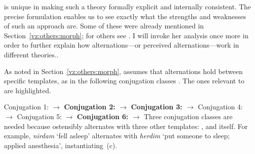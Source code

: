 \begin{exe}
\begin{xlist}
\begin{xlist}
\begin{exe}
\begin{exe}
\begin{xlist}
\begin{exe}
\begin{xlist}
\begin{exe}
\begin{xlist}
\begin{xlist}
\begin{exe}
\begin{xlist}
\begin{exe}
\begin{xlist}
\begin{exe}
\begin{exe}
\begin{exe}
\begin{xlist}
\begin{exe}
\begin{exe}
\begin{xlist}
\begin{xlist}
\begin{exe}
\begin{xlist}
\begin{exe}
\begin{exe}
\begin{exe}
\begin{xlist}
\begin{exe}
\begin{exe}
\begin{xlist}
\begin{exe}
\begin{xlist}
\begin{exe}
\begin{xlist}
\begin{exe}
\begin{xlist}
\begin{exe}
\begin{exe}
\begin{xlist}
\begin{exe}
\begin{exe}
\begin{xlist}
\begin{xlist}
\begin{exe}
\begin{xlist}
\begin{xlist}
\begin{exe}
\begin{xlist}
\begin{exe}
\begin{xlist}
\begin{exe}
\begin{xlist}
\begin{exe}
\begin{xlist}
\begin{exe}
\begin{exe}
\begin{exe}
\begin{exe}
\begin{xlist}
\begin{exe}
\begin{exe}
\begin{xlist}
\begin{xlist}
\begin{exe}
\cite{arad05} is unique in making such a theory formally explicit and internally consistent. The precise formulation enables us to see exactly what the strengths and weaknesses of such an approach are. Some of these were already mentioned in Section~\ref{vz:others:morph}; for others see \cite{kastnertucker19cup}. I will invoke her analysis once more in order to further explain how alternations---or perceived alternations---work in different theories..

As noted in Section~\ref{vz:others:morph}, \cite{arad05} assumes that alternations hold between specific templates, as in the following conjugation classes \cite[226]{arad05}. The ones relevant to {\thif} are highlighted.
 \begin{exe}
 \ex  
 \begin{xlist} 
 	\ex  Conjugation 1: {\tnif} $\rightarrow$ {\tkal} 
 	\ex  \textbf{Conjugation 2: {\tkal} $\rightarrow$ {\thif}} 
 	\ex  \textbf{Conjugation 3: {\tnif} $\rightarrow$ {\thif}} 
 	\ex  Conjugation 4: {\thit} $\rightarrow$ {\tpie} 
 	\ex  Conjugation 5: {\thit} $\rightarrow$ {\tpie} 
 	\ex  \textbf{Conjugation 6: {\thif} $\rightarrow$ {\thif}} 
 \z
\z 
Three conjugation classes are needed because {\thif} ostensibly alternates with three other templates: {\tkal}, {\tnif} and {\thif} itself. For example, \emph{nirdam} `fell asleep' alternates with \emph{herdim} `put someone to sleep; applied anesthesia', instantiating~(\lastx c).


\end{xlist}
\end{exe}
\end{exe}
\end{xlist}
\end{xlist}
\end{exe}
\end{exe}
\end{xlist}
\end{exe}
\end{exe}
\end{exe}
\end{exe}
\end{xlist}
\end{exe}
\end{xlist}
\end{exe}
\end{xlist}
\end{exe}
\end{xlist}
\end{exe}
\end{xlist}
\end{xlist}
\end{exe}
\end{xlist}
\end{xlist}
\end{exe}
\end{exe}
\end{xlist}
\end{exe}
\end{exe}
\end{xlist}
\end{exe}
\end{xlist}
\end{exe}
\end{xlist}
\end{exe}
\end{xlist}
\end{exe}
\end{exe}
\end{xlist}
\end{exe}
\end{exe}
\end{exe}
\end{xlist}
\end{exe}
\end{xlist}
\end{xlist}
\end{exe}
\end{exe}
\end{xlist}
\end{exe}
\end{exe}
\end{exe}
\end{xlist}
\end{exe}
\end{xlist}
\end{exe}
\end{xlist}
\end{xlist}
\end{exe}
\end{xlist}
\end{exe}
\end{xlist}
\end{exe}
\end{exe}
\end{xlist}
\end{xlist}
\end{exe}
